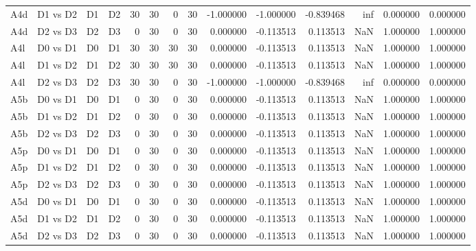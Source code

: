 \begin{tabular}{llllrrrrrrrrrr}
A4d & D1 vs D2 & D1 & D2 & 30 & 30 & 0 & 30 & -1.000000 & -1.000000 & -0.839468 & inf & 0.000000 & 0.000000 \\
A4d & D2 vs D3 & D2 & D3 & 0 & 30 & 0 & 30 & 0.000000 & -0.113513 & 0.113513 & NaN & 1.000000 & 1.000000 \\
A4l & D0 vs D1 & D0 & D1 & 30 & 30 & 30 & 30 & 0.000000 & -0.113513 & 0.113513 & NaN & 1.000000 & 1.000000 \\
A4l & D1 vs D2 & D1 & D2 & 30 & 30 & 30 & 30 & 0.000000 & -0.113513 & 0.113513 & NaN & 1.000000 & 1.000000 \\
A4l & D2 vs D3 & D2 & D3 & 30 & 30 & 0 & 30 & -1.000000 & -1.000000 & -0.839468 & inf & 0.000000 & 0.000000 \\
A5b & D0 vs D1 & D0 & D1 & 0 & 30 & 0 & 30 & 0.000000 & -0.113513 & 0.113513 & NaN & 1.000000 & 1.000000 \\
A5b & D1 vs D2 & D1 & D2 & 0 & 30 & 0 & 30 & 0.000000 & -0.113513 & 0.113513 & NaN & 1.000000 & 1.000000 \\
A5b & D2 vs D3 & D2 & D3 & 0 & 30 & 0 & 30 & 0.000000 & -0.113513 & 0.113513 & NaN & 1.000000 & 1.000000 \\
A5p & D0 vs D1 & D0 & D1 & 0 & 30 & 0 & 30 & 0.000000 & -0.113513 & 0.113513 & NaN & 1.000000 & 1.000000 \\
A5p & D1 vs D2 & D1 & D2 & 0 & 30 & 0 & 30 & 0.000000 & -0.113513 & 0.113513 & NaN & 1.000000 & 1.000000 \\
A5p & D2 vs D3 & D2 & D3 & 0 & 30 & 0 & 30 & 0.000000 & -0.113513 & 0.113513 & NaN & 1.000000 & 1.000000 \\
A5d & D0 vs D1 & D0 & D1 & 0 & 30 & 0 & 30 & 0.000000 & -0.113513 & 0.113513 & NaN & 1.000000 & 1.000000 \\
A5d & D1 vs D2 & D1 & D2 & 0 & 30 & 0 & 30 & 0.000000 & -0.113513 & 0.113513 & NaN & 1.000000 & 1.000000 \\
A5d & D2 vs D3 & D2 & D3 & 0 & 30 & 0 & 30 & 0.000000 & -0.113513 & 0.113513 & NaN & 1.000000 & 1.000000 \\
\bottomrule
\end{tabular}
